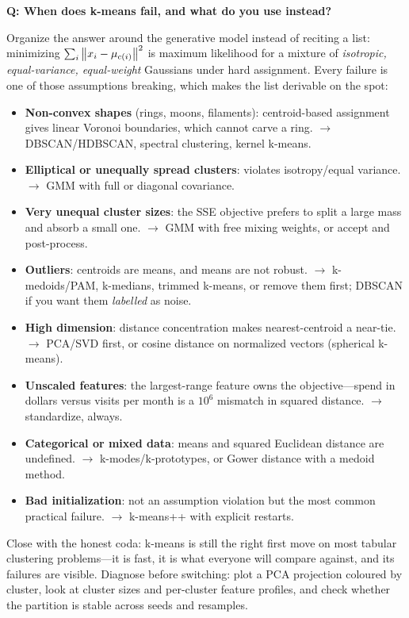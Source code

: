 \begin{interviewq}
\textbf{Q: When does k-means fail, and what do you use instead?}

 \quad {} \quad \badgefreq{\freqhigh}

\stronganswer

Organize the answer around the generative model instead of reciting a list: minimizing $\sum_i\left\lVert x_i - \mu_{c(i)}\right\rVert^2$ is maximum likelihood for a mixture of \emph{isotropic, equal-variance, equal-weight} Gaussians under hard assignment. Every failure is one of those assumptions breaking, which makes the list derivable on the spot:

\begin{itemize}
    \item \textbf{Non-convex shapes} (rings, moons, filaments): centroid-based assignment gives linear Voronoi boundaries, which cannot carve a ring. $\to$ DBSCAN/HDBSCAN, spectral clustering, kernel k-means.
    \item \textbf{Elliptical or unequally spread clusters}: violates isotropy/equal variance. $\to$ GMM with full or diagonal covariance.
    \item \textbf{Very unequal cluster sizes}: the SSE objective prefers to split a large mass and absorb a small one. $\to$ GMM with free mixing weights, or accept and post-process.
    \item \textbf{Outliers}: centroids are means, and means are not robust. $\to$ k-medoids/PAM, k-medians, trimmed k-means, or remove them first; DBSCAN if you want them \emph{labelled} as noise.
    \item \textbf{High dimension}: distance concentration makes nearest-centroid a near-tie. $\to$ PCA/SVD first, or cosine distance on normalized vectors (spherical k-means).
    \item \textbf{Unscaled features}: the largest-range feature owns the objective---spend in dollars versus visits per month is a $10^6$ mismatch in squared distance. $\to$ standardize, always.
    \item \textbf{Categorical or mixed data}: means and squared Euclidean distance are undefined. $\to$ k-modes/k-prototypes, or Gower distance with a medoid method.
    \item \textbf{Bad initialization}: not an assumption violation but the most common practical failure. $\to$ k-means++ with explicit restarts.
\end{itemize}

Close with the honest coda: k-means is still the right first move on most tabular clustering problems---it is fast, it is what everyone will compare against, and its failures are visible. Diagnose before switching: plot a PCA projection coloured by cluster, look at cluster sizes and per-cluster feature profiles, and check whether the partition is stable across seeds and resamples.


\end{interviewq}
